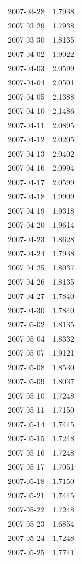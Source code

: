 \begin{tabular}{lr}
2007-03-28 &      1.7938 \\
2007-03-29 &      1.7938 \\
2007-03-30 &      1.8135 \\
2007-04-02 &      1.9022 \\
2007-04-03 &      2.0599 \\
2007-04-04 &      2.0501 \\
2007-04-05 &      2.1388 \\
2007-04-10 &      2.1486 \\
2007-04-11 &      2.0895 \\
2007-04-12 &      2.0205 \\
2007-04-13 &      2.0402 \\
2007-04-16 &      2.0994 \\
2007-04-17 &      2.0599 \\
2007-04-18 &      1.9909 \\
2007-04-19 &      1.9318 \\
2007-04-20 &      1.9614 \\
2007-04-23 &      1.8628 \\
2007-04-24 &      1.7938 \\
2007-04-25 &      1.8037 \\
2007-04-26 &      1.8135 \\
2007-04-27 &      1.7840 \\
2007-04-30 &      1.7840 \\
2007-05-02 &      1.8135 \\
2007-05-04 &      1.8332 \\
2007-05-07 &      1.9121 \\
2007-05-08 &      1.8530 \\
2007-05-09 &      1.8037 \\
2007-05-10 &      1.7248 \\
2007-05-11 &      1.7150 \\
2007-05-14 &      1.7445 \\
2007-05-15 &      1.7248 \\
2007-05-16 &      1.7248 \\
2007-05-17 &      1.7051 \\
2007-05-18 &      1.7150 \\
2007-05-21 &      1.7445 \\
2007-05-22 &      1.7248 \\
2007-05-23 &      1.6854 \\
2007-05-24 &      1.7248 \\
2007-05-25 &      1.7741 \\

\end{tabular}

